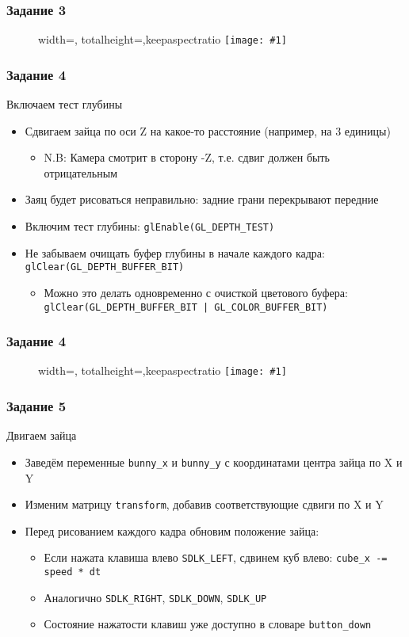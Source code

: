 \documentclass{beamer}
\newcommand{\slideimage}[1]{
  \begin{figure}
    \begin{adjustbox}{width=\textwidth, totalheight=\textheight-2\baselineskip-2\baselineskip,keepaspectratio}
      \texttt{[image: \#1]}
    \end{adjustbox}
  \end{figure}
}
\begin{document}
\begin{frame}[fragile]
\frametitle{Задание 3}
\slideimage{3.png}
\end{frame}

\begin{frame}[fragile]
\frametitle{Задание 4}
Включаем тест глубины
\begin{itemize}
\item Сдвигаем зайца по оси Z на какое-то расстояние (например, на 3 единицы)
\begin{itemize}
\item N.B: Камера смотрит в сторону -Z, т.е. сдвиг должен быть отрицательным
\end{itemize}
\item Заяц будет рисоваться неправильно: задние грани перекрывают передние
\item Включим тест глубины: \verb|glEnable(GL_DEPTH_TEST)|
\item Не забываем очищать буфер глубины в начале каждого кадра: \verb|glClear(GL_DEPTH_BUFFER_BIT)|
\begin{itemize}
\item Можно это делать одновременно с очисткой цветового буфера:  \verb=glClear(GL_DEPTH_BUFFER_BIT | GL_COLOR_BUFFER_BIT)=
\end{itemize}
\end{itemize}
\end{frame}

\begin{frame}[fragile]
\frametitle{Задание 4}
\slideimage{4.png}
\end{frame}

\begin{frame}[fragile]
\frametitle{Задание 5}
Двигаем зайца
\begin{itemize}
\item Заведём переменные \verb|bunny_x| и \verb|bunny_y| с координатами центра зайца по X и Y
\item Изменим матрицу \verb|transform|, добавив соответствующие сдвиги по X и Y
\item Перед рисованием каждого кадра обновим положение зайца:
\begin{itemize}
\item Если нажата клавиша влево \verb|SDLK_LEFT|, сдвинем куб влево: \verb|cube_x -= speed * dt|
\item Аналогично \verb|SDLK_RIGHT|, \verb|SDLK_DOWN|, \verb|SDLK_UP|
\item Состояние нажатости клавиш уже доступно в словаре \verb|button_down|
\end{itemize}
\end{itemize}
\end{frame}
\end{document}

